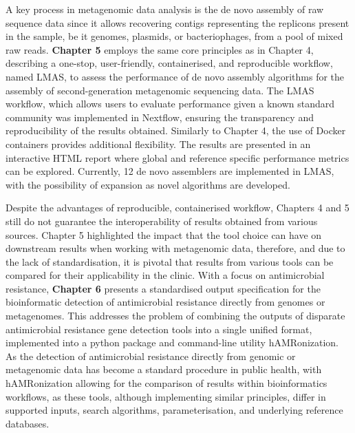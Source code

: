 A key process in metagenomic data analysis is the de novo assembly of raw sequence data since it allows recovering contigs representing the replicons present in the sample, be it genomes, plasmids, or bacteriophages, from a pool of mixed raw reads. \textbf{Chapter 5} employs the same core principles as in Chapter 4, describing a one-stop, user-friendly, containerised, and reproducible workflow, named LMAS, to assess the performance of de novo assembly algorithms for the assembly of second-generation metagenomic sequencing data. The LMAS workflow, which allows users to evaluate performance given a known standard community was implemented in Nextflow, ensuring the transparency and reproducibility of the results obtained. Similarly to Chapter 4, the use of Docker containers provides additional flexibility. The results are presented in an interactive HTML report where global and reference specific performance metrics can be explored. Currently, 12 de novo assemblers are implemented in LMAS, with the possibility of expansion as novel algorithms are developed. 

Despite the advantages of reproducible, containerised workflow, Chapters 4 and 5 still do not guarantee the interoperability of results obtained from various sources. Chapter 5 highlighted the impact that the tool choice can have on downstream results when working with metagenomic data, therefore, and due to the lack of standardisation, it is pivotal that results from various tools can be compared for their applicability in the clinic. With a focus on antimicrobial resistance, \textbf{Chapter 6} presents a standardised output specification for the bioinformatic detection of antimicrobial resistance directly from genomes or metagenomes. This addresses the problem of combining the outputs of disparate antimicrobial resistance gene detection tools into a single unified format, implemented into a python package and command-line utility hAMRonization. As the detection of antimicrobial resistance directly from genomic or metagenomic data has become a standard procedure in public health, with hAMRonization allowing for the comparison of results within bioinformatics workflows, as these tools, although implementing similar principles, differ in supported inputs, search algorithms, parameterisation, and underlying reference databases. 

